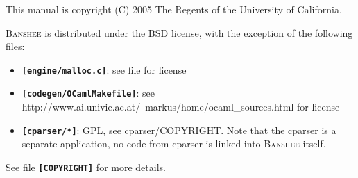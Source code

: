 \documentclass[10pt]{article}
\newcommand{\banshee}{\textsc{Banshee}}
\newcommand{\file}[1]{\texttt{\textbf{[#1]}}}
\begin{document}
This manual is copyright (C) 2005 The Regents of the University of
California.

\banshee{} is distributed under the BSD license, with the exception of
the following files:

\begin{itemize}
\item \file{engine/malloc.c}: see file for license
\item \file{codegen/OCamlMakefile}: see
  http://www.ai.univie.ac.at/~markus/home/ocaml\_sources.html for
  license
\item \file{cparser/*}: GPL, see cparser/COPYRIGHT. Note that the
  cparser is a separate application, no code from cparser is linked
  into \banshee{} itself.
\end{itemize}

See file \file{COPYRIGHT} for more details.
\end{document}
